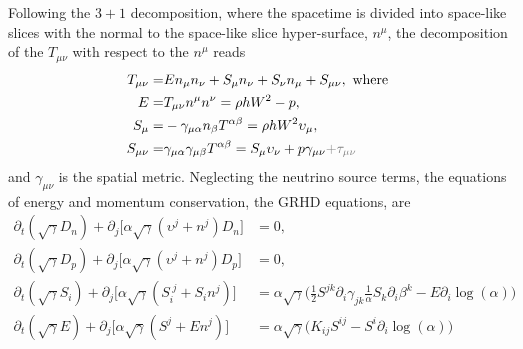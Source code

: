 %
Following the $3+1$ decomposition, 
where the spacetime is divided into space-like slices with the normal to the space-like slice 
hyper-surface, $n^{\mu}$, the decomposition of the $T_{\mu\nu}$ with respect to the $n^{\mu}$ reads
%
%
%
%
%
%
\begin{subequations}
\begin{align}
T_{\mu\nu} =& En_{\mu}n_{\nu} + S_{\mu}n_{\nu} + S_{\nu}n_{\mu} + S_{\mu\nu}, \text{ where } \\
E =& T_{\mu\nu}n^{\mu}n^{\nu} = \rho h W^2 - p, \\
S_{\mu} =& -\gamma_{\mu\alpha}n_{\beta}T^{\alpha\beta} = \rho h W^2 \upsilon_{\mu}, \\
S_{\mu\nu} =& \gamma_{\mu\alpha}\gamma_{\mu\beta}T^{\alpha\beta} = S_{\mu}\upsilon_{\nu} + p \gamma_{\mu\nu} \gray{ + \tau_{\mu\nu}}
\end{align}
\end{subequations}
%
and $\gamma_{\mu\nu}$ is the spatial metric.
%
Neglecting the neutrino source terms, the equations of energy and momentum conservation, 
the \ac{GRHD} equations, are 
\begin{equation}
\label{eq:theory:whisky:emomcons_lk}
\begin{aligned}
\partial_t(\sqrt{\gamma}D_n) + \partial_j\Big[ \alpha\sqrt{\gamma}(\upsilon^j + n^j)D_n \Big] &= 0, \\
\partial_t(\sqrt{\gamma}D_p) + \partial_j\Big[ \alpha\sqrt{\gamma}(\upsilon^j + n^j)D_p \Big] &= 0, \\
\partial_t(\sqrt{\gamma}S_i) + \partial_j\Big[ \alpha \sqrt{\gamma} (S_i^{\; j} + S_i n^j) \Big] &= 
\alpha \sqrt{\gamma}\Big( \frac{1}{2} S^{jk} \partial_i \gamma_{jk} \frac{1}{\alpha} S_k \partial_i \beta^k - E\partial_i \log(\alpha) \Big) \\
\partial_t(\sqrt{\gamma}E) + \partial_j\Big[ \alpha \sqrt{\gamma} (S^{j} + E n^j) \Big] &= 
\alpha \sqrt{\gamma}\Big( K_{ij}S^{ij} - S^i\partial_i \log(\alpha) \Big) 
\end{aligned}
\end{equation}
